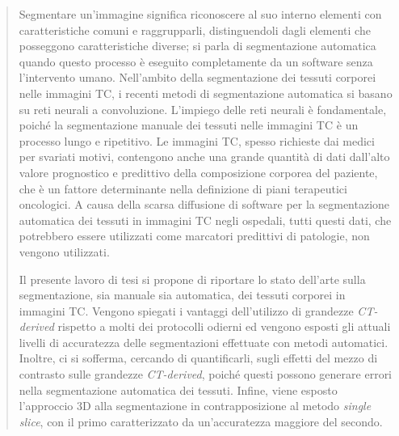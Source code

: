 \begin{abstract}
    Segmentare un'immagine significa riconoscere al suo interno elementi con caratteristiche comuni e raggrupparli, distinguendoli dagli elementi che posseggono caratteristiche diverse; si parla di segmentazione automatica quando questo processo è eseguito completamente da un software senza l'intervento umano. Nell'ambito della segmentazione dei tessuti corporei nelle immagini TC, i recenti metodi di segmentazione automatica si basano su reti neurali a convoluzione. L'impiego delle reti neurali è fondamentale, poiché la segmentazione manuale dei tessuti nelle immagini TC è un processo lungo e ripetitivo. Le immagini TC, spesso richieste dai medici per svariati motivi, contengono anche una grande quantità di dati dall'alto valore prognostico e predittivo della composizione corporea del paziente, che è un fattore determinante nella definizione di piani terapeutici oncologici. A causa della scarsa diffusione di software per la segmentazione automatica dei tessuti in immagini TC negli ospedali, tutti questi dati, che potrebbero essere utilizzati come marcatori predittivi di patologie, non vengono utilizzati.
    
    Il presente lavoro di tesi si propone di riportare lo stato dell'arte sulla segmentazione, sia manuale sia automatica, dei tessuti corporei in immagini TC. Vengono spiegati i vantaggi dell'utilizzo di grandezze \textit{CT-derived} rispetto a molti dei protocolli odierni ed vengono esposti gli attuali livelli di accuratezza delle segmentazioni effettuate con metodi automatici. Inoltre, ci si sofferma, cercando di quantificarli, sugli effetti del mezzo di contrasto sulle grandezze \textit{CT-derived}, poiché questi possono generare errori nella segmentazione automatica dei tessuti. Infine, viene esposto l'approccio 3D alla segmentazione in contrapposizione al metodo \textit{single slice}, con il primo caratterizzato da un'accuratezza maggiore del secondo.
\end{abstract}

